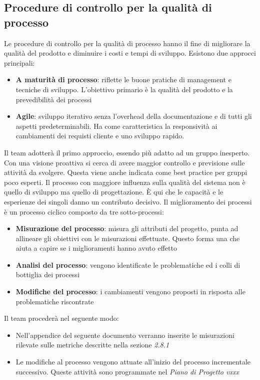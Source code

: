 {\subsection{Procedure di controllo per la qualità di processo}
Le procedure di controllo per la qualità di processo hanno il fine di migliorare la qualità del
prodotto e diminuire i costi e tempi di sviluppo. Esistono due
approcci principali:
\begin{itemize}
\item \textbf{A maturità di processo}: riflette le buone pratiche di management e tecniche di sviluppo.
  L’obiettivo primario è la qualità del prodotto e la prevedibilità dei processi
\item \textbf{Agile}: sviluppo iterativo senza l’overhead della
  documentazione e di tutti gli aspetti predeterminabili. Ha come
  caratteristica la responsività ai cambiamenti dei requisti cliente e 
  uno sviluppo rapido.  
\end{itemize}
Il team adotterà il primo approccio, essendo più adatto ad un gruppo inesperto. Con una visione
proattiva si cerca di avere maggior controllo e previsione sulle attività da svolgere. Questa viene
anche indicata come best practice per gruppi poco esperti.
Il processo con maggiore influenza sulla qualità del sistema non è quello di sviluppo ma quello
di progettazione. È qui che le capacità e le esperienze dei singoli danno un contributo decisivo.
Il miglioramento dei processi è un processo ciclico composto da tre
sotto-processi:

\begin{itemize}
\item \textbf{Misurazione del processo}: misura gli attributi del progetto, punta ad allineare gli
  obiettivi con le misurazioni effettuate. Questo forma una  che aiuta a capire se i
  miglioramenti hanno avuto effetto
\item \textbf{Analisi del processo}: vengono identificate le problematiche ed i colli di bottiglia dei
  processi
\item \textbf{Modifiche del processo}: i cambiamenti vengono proposti in risposta alle problematiche
  riscontrate
\end{itemize}
Il team procederà nel seguente modo:
\begin{itemize}
\item Nell'appendice del seguente documento verranno inserite le misurazioni
  rilevate sulle metriche descritte nella sezione \emph{2.8.1}
\item Le modifiche al processo vengono attuate all’inizio del processo incrementale successivo.
  Queste attività sono programmate nel  \emph{Piano di Progetto vxxx} 
\end{itemize}




}
